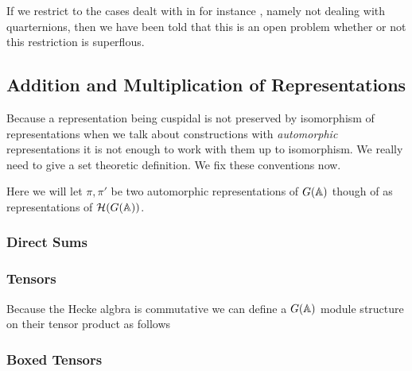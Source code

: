 If we restrict to the cases dealt with in for instance \cite{moeglinSpectralDecompositionEisenstein1995}, namely not dealing with quarternions, then we have been told that this is an open problem whether or not this restriction is superflous. 


\subsection{Addition and Multiplication of Representations}
Because a representation being cuspidal is not preserved by isomorphism of representations when we talk about constructions with \textit{automorphic}  representations it is not enough to work with them up to isomorphism. We really need to give a set theoretic definition. We fix these conventions now. 

Here we will let \(\pi, \pi'\) be two automorphic representations of \(G(\A)\) though of as representations of \(\mathcal{H}(G(\A))\). 

\subsubsection{Direct Sums}

\subsubsection{Tensors}
Because the Hecke algbra is commutative  we can define a \(G(\A)\) module structure on their tensor product as follows

\subsubsection{Boxed Tensors}

